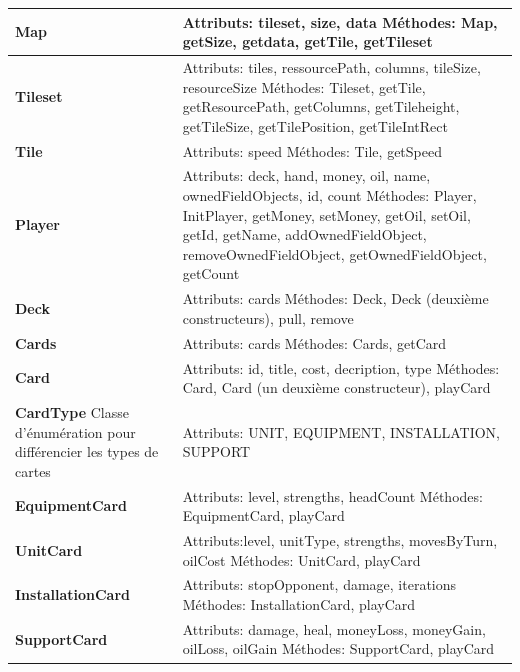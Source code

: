\begin{tabularx}{15 cm}{|X|X|}
\hline
\textbf{Map} & Attributs: tileset, size, data  \newline Méthodes: Map, getSize, getdata, getTile, getTileset\\
\hline
\textbf{Tileset} & Attributs: tiles, ressourcePath, columns, tileSize, resourceSize  \newline Méthodes: Tileset, getTile, getResourcePath, getColumns, getTileheight, getTileSize, getTilePosition, getTileIntRect\\
\hline
\textbf{Tile} & Attributs: speed  \newline Méthodes: Tile, getSpeed\\
\hline
\textbf{Player} & Attributs: deck, hand, money, oil, name, ownedFieldObjects, id, count  \newline Méthodes: Player, InitPlayer,  getMoney, setMoney, getOil, setOil, getId, getName, addOwnedFieldObject, removeOwnedFieldObject, getOwnedFieldObject, getCount\\
\hline
\textbf{Deck} & Attributs: cards  \newline Méthodes: Deck, Deck (deuxième constructeurs), pull, remove\\
\hline
\textbf{Cards} & Attributs: cards  \newline Méthodes: Cards, getCard\\
\hline
\textbf{Card} & Attributs: id, title, cost, decription, type  \newline Méthodes: Card, Card (un deuxième constructeur), playCard\\
\hline
\textbf{CardType} \newline Classe d'énumération pour différencier les types de cartes & Attributs: UNIT, EQUIPMENT, INSTALLATION, SUPPORT  \newline \\
\hline
\textbf{EquipmentCard} & Attributs: level, strengths, headCount  \newline Méthodes: EquipmentCard, playCard\\
\hline
\textbf{UnitCard} & Attributs:level, unitType, strengths, movesByTurn, oilCost  \newline Méthodes: UnitCard, playCard\\
\hline
\textbf{InstallationCard} & Attributs: stopOpponent, damage, iterations \newline Méthodes: InstallationCard, playCard\\
\hline
\textbf{SupportCard} & Attributs: damage, heal, moneyLoss, moneyGain, oilLoss, oilGain  \newline Méthodes: SupportCard, playCard\\
\hline
\end{tabularx}

